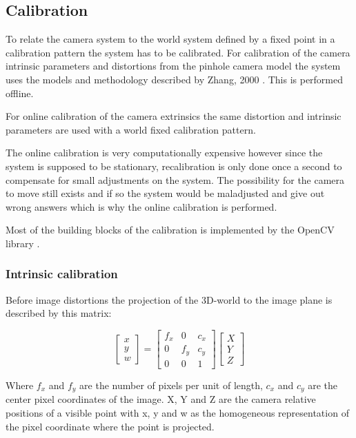 
\subsection{Calibration}
To relate the camera system to the world system defined by a fixed point in a calibration pattern the system has to be calibrated. For calibration of the camera intrinsic parameters and distortions from the pinhole camera model the system uses the models and methodology described by Zhang, 2000 \cite{zhang}. This is performed offline.

For online calibration of the camera extrinsics the same distortion and intrinsic parameters are used with a world fixed calibration pattern.

The online calibration is very computationally expensive however since the system is supposed to be stationary, recalibration is only done once a second to compensate for small adjustments on the system. The possibility for the camera to move still exists and if so the system would be maladjusted and give out wrong answers which is why the online calibration is performed.

Most of the building blocks of the calibration is implemented by the OpenCV library \cite{camcal}. 

\subsubsection{Intrinsic calibration}
Before image distortions the projection of the 3D-world to the image plane is described by this matrix:

\[\begin{bmatrix}
x \\
y \\
w
\end{bmatrix}
=
\begin{bmatrix}
 f_x & 0   & c_x \\ 
 0   & f_y & c_y \\ 
 0   & 0   & 1
\end{bmatrix}
\begin{bmatrix}
X \\
Y \\
Z
\end{bmatrix}\] 

Where $f_x$ and $f_y$ are the number of pixels per unit of length, $c_x$ and $c_y$ are the center pixel coordinates of the image. X, Y and Z are the camera relative positions of a visible point with x, y and w as the homogeneous representation of the pixel coordinate where the point is projected.

